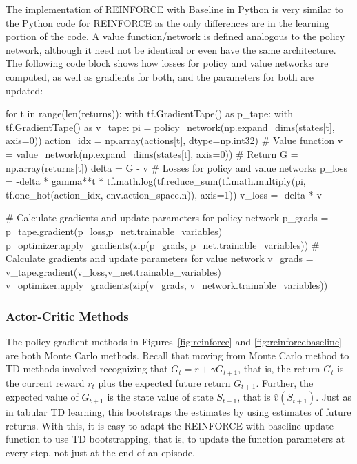 \begin{withcode}
The implementation of REINFORCE with Baseline in Python is very similar to the Python code for REINFORCE as the only differences are in the learning portion of the code. A value function/network is defined analogous to the policy network, although it need not be identical or even have the same architecture. The following code block shows how losses for policy and value networks are computed, as well as gradients for both, and the parameters for both are updated:

\begin{pythoncode}
for t in range(len(returns)):
    with tf.GradientTape() as p_tape:
        with tf.GradientTape() as v_tape:
            pi = policy_network(np.expand_dims(states[t], axis=0))
            action_idx = np.array(actions[t], dtype=np.int32)
            # Value function
            v = value_network(np.expand_dims(states[t], axis=0))
            # Return
            G = np.array(returns[t])
            delta = G - v
            # Losses for policy and value networks
            p_loss = -delta * gamma**t *
                tf.math.log(tf.reduce_sum(tf.math.multiply(pi,
                    tf.one_hot(action_idx, env.action_space.n)),
                    axis=1))
            v_loss = -delta * v

    # Calculate gradients and update parameters for policy network
    p_grads = p_tape.gradient(p_loss,p_net.trainable_variables)  
    p_optimizer.apply_gradients(zip(p_grads, 
        p_net.trainable_variables))
    # Calculate gradients and update parameters for value network
    v_grads = v_tape.gradient(v_loss,v_net.trainable_variables)
    v_optimizer.apply_gradients(zip(v_grads, 
        v_network.trainable_variables))
\end{pythoncode}
\end{withcode}

\subsubsection*{Actor-Critic Methods}

The policy gradient methods in Figures~\ref{fig:reinforce} and \ref{fig:reinforcebaseline} are both Monte Carlo methods. Recall that moving from Monte Carlo method to TD methods involved recognizing that $G_{t} = r + \gamma G_{t+1}$, that is, the return $G_{t}$ is the current reward $r_t$ plus the expected future return $G_{t+1}$. Further, the expected value of $G_{t+1}$ is the state value of state $S_{t+1}$, that is $\hat{v}(S_{t+1})$. Just as in tabular TD learning, this bootstraps the estimates by using estimates of future returns. With this, it is easy to adapt the REINFORCE with baseline update function to use TD bootstrapping, that is, to update the function parameters at every step, not just at the end of an episode. 

